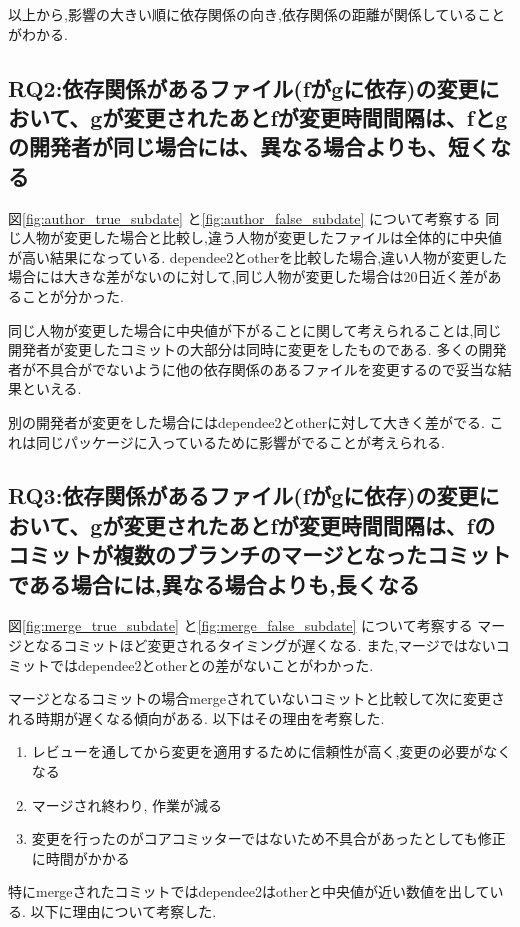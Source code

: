 \documentclass{fose2016}           %
\begin{document}
以上から,影響の大きい順に依存関係の向き,依存関係の距離が関係していることがわかる.


\subsection{RQ2:依存関係があるファイル(fがgに依存)の変更において、gが変更されたあとfが変更時間間隔は、fとgの開発者が同じ場合には、異なる場合よりも、短くなる}
図\ref{fig:author_true_subdate} と\ref{fig:author_false_subdate} について考察する
同じ人物が変更した場合と比較し,違う人物が変更したファイルは全体的に中央値が高い結果になっている.
dependee2とotherを比較した場合,違い人物が変更した場合には大きな差がないのに対して,同じ人物が変更した場合は20日近く差があることが分かった.

同じ人物が変更した場合に中央値が下がることに関して考えられることは,同じ開発者が変更したコミットの大部分は同時に変更をしたものである.
多くの開発者が不具合がでないように他の依存関係のあるファイルを変更するので妥当な結果といえる.

別の開発者が変更をした場合にはdependee2とotherに対して大きく差がでる.
これは同じパッケージに入っているために影響がでることが考えられる.

\subsection{RQ3:依存関係があるファイル(fがgに依存)の変更において、gが変更されたあとfが変更時間間隔は、fのコミットが複数のブランチのマージとなったコミットである場合には,異なる場合よりも,長くなる}
図\ref{fig:merge_true_subdate} と\ref{fig:merge_false_subdate} について考察する
マージとなるコミットほど変更されるタイミングが遅くなる.
また,マージではないコミットではdependee2とotherとの差がないことがわかった.


マージとなるコミットの場合mergeされていないコミットと比較して次に変更される時期が遅くなる傾向がある.
以下はその理由を考察した.
\begin{enumerate}
\item レビューを通してから変更を適用するために信頼性が高く,変更の必要がなくなる
\item マージされ終わり, 作業が減る
\item 変更を行ったのがコアコミッターではないため不具合があったとしても修正に時間がかかる
\end{enumerate}

特にmergeされたコミットではdependee2はotherと中央値が近い数値を出している.
以下に理由について考察した.
\end{document}
